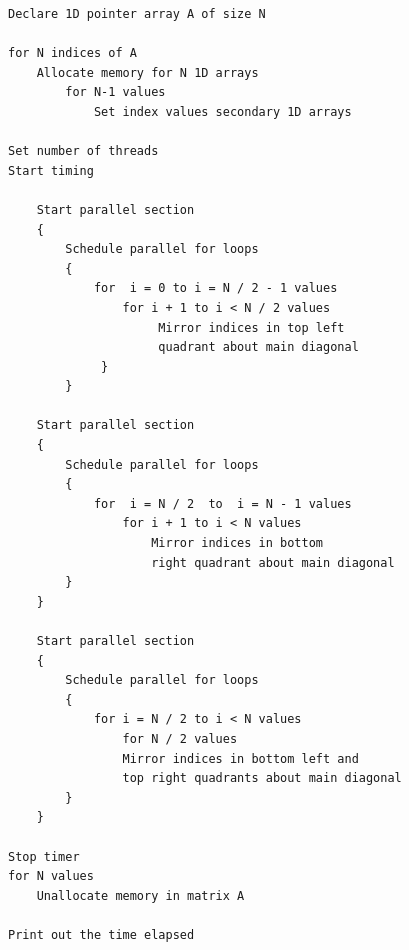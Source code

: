 \documentclass[conference]{IEEEtran}
\begin{document}
\begin{Verbatim}
Declare 1D pointer array A of size N

for N indices of A
    Allocate memory for N 1D arrays 
		for N-1 values
		    Set index values secondary 1D arrays	

Set number of threads
Start timing

	Start parallel section
	{
		Schedule parallel for loops
		{
		    for  i = 0 to i = N / 2 - 1 values
			    for i + 1 to i < N / 2 values
			         Mirror indices in top left 
			         quadrant about main diagonal
	         }
        }
        
	Start parallel section
	{
		Schedule parallel for loops
		{
		    for  i = N / 2  to  i = N - 1 values
			    for i + 1 to i < N values 
				    Mirror indices in bottom 
				    right quadrant about main diagonal
		}
	}
	
	Start parallel section
	{
		Schedule parallel for loops
		{
		    for i = N / 2 to i < N values 
			    for N / 2 values 
				Mirror indices in bottom left and
				top right quadrants about main diagonal
		}
	}
	
Stop timer
for N values	
	Unallocate memory in matrix A
    
Print out the time elapsed

\end{Verbatim}  
\end{document}

